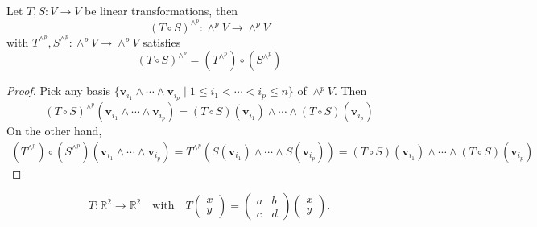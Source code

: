 \begin{proposition}
Let $T, S : V \to V$ be linear transformations, then
\[
(T \circ S)^{\wedge^p} : \wedge^p V \to \wedge^p V
\]
with $T^{\wedge^p}, S^{\wedge^p} : \wedge^p V \to \wedge^p V$ satisfies
\[
(T \circ S)^{\wedge^p} = (T^{\wedge^p}) \circ (S^{\wedge^p})
\]
\end{proposition}

\begin{proof}
Pick any basis $\{ \mathbf{v}_{i_1} \wedge \cdots \wedge \mathbf{v}_{i_p} \mid 1 \leq i_1 < \cdots < i_p \leq n \}$ of $\wedge^p V$. Then
\[
(T \circ S)^{\wedge^p}(\mathbf{v}_{i_1} \wedge \cdots \wedge \mathbf{v}_{i_p}) = (T \circ S)(\mathbf{v}_{i_1}) \wedge \cdots \wedge (T \circ S)(\mathbf{v}_{i_p})
\]
On the other hand,
\begin{align*}
    (T^{\wedge^p}) \circ (S^{\wedge^p})(\mathbf{v}_{i_1} \wedge \cdots \wedge \mathbf{v}_{i_p}) = T^{\wedge^p}(S(\mathbf{v}_{i_1}) \wedge \cdots \wedge S(\mathbf{v}_{i_p})) = 
    (T \circ S)(\mathbf{v}_{i_1}) \wedge \cdots \wedge (T \circ S)(\mathbf{v}_{i_p})
\end{align*}
\end{proof}

\[
T : \mathbb{R}^2 \to \mathbb{R}^2
\quad \text{with} \quad
T\begin{pmatrix} x \\ y \end{pmatrix}
= \begin{pmatrix}
a & b \\
c & d
\end{pmatrix}
\begin{pmatrix}
x \\ y
\end{pmatrix}.
\]

